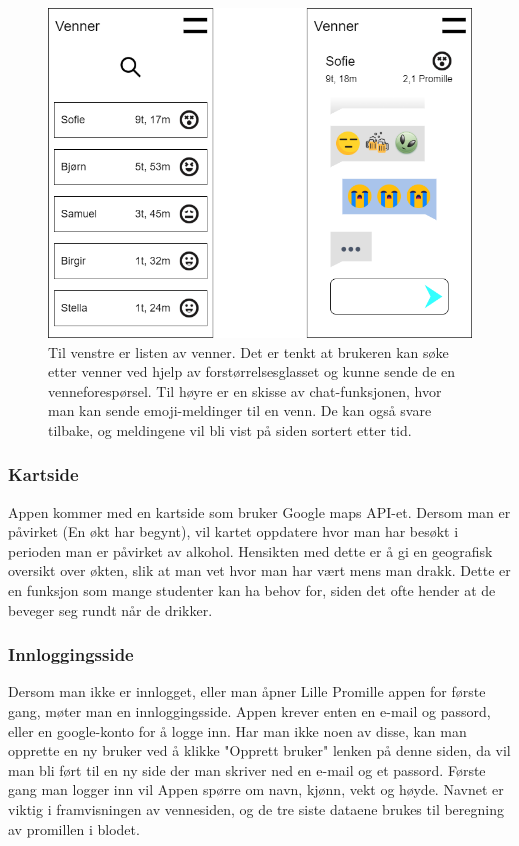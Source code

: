 \begin{figure}[H]
    \centering
    \includegraphics[scale=0.4]{images/lille_promille_friends.drawio.png}
    \caption{Til venstre er listen av venner. Det er tenkt at brukeren kan søke etter venner ved hjelp av forstørrelsesglasset og kunne sende de en venneforespørsel. Til høyre er en skisse av chat-funksjonen, hvor man kan sende emoji-meldinger til en venn. De kan også svare tilbake, og meldingene vil bli vist på siden sortert etter tid.}
\end{figure}

\subsubsection{Kartside}
Appen kommer med en kartside som bruker Google maps API-et. Dersom man er påvirket (En økt har begynt), vil kartet oppdatere hvor man har besøkt i perioden man er påvirket av alkohol. Hensikten med dette er å gi en geografisk oversikt over økten, slik at man vet hvor man har vært mens man drakk. Dette er en funksjon som mange studenter kan ha behov for, siden det ofte hender at de beveger seg rundt når de drikker.

\subsubsection{Innloggingsside}
Dersom man ikke er innlogget, eller man åpner Lille Promille appen for første gang, møter man en innloggingsside. Appen krever enten en e-mail og passord, eller en google-konto for å logge inn. Har man ikke noen av disse, kan man opprette en ny bruker ved å klikke "Opprett bruker" lenken på denne siden, da vil man bli ført til en ny side der man skriver ned en e-mail og et passord. Første gang man logger inn vil Appen spørre om navn, kjønn, vekt og høyde. Navnet er viktig i framvisningen av vennesiden, og de tre siste dataene brukes til beregning av promillen i blodet.

